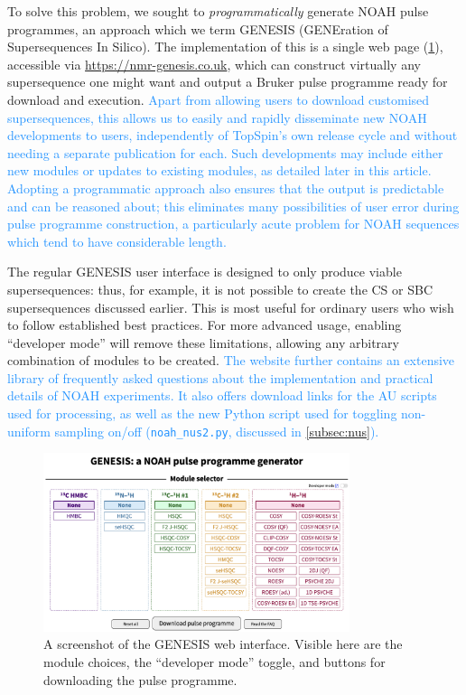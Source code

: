 \documentclass[a4paper,11pt]{article}
\newcommand{\changed}[1]{\textcolor{DodgerBlue}{#1}}
\newcommand{\theurl}{\url{https://nmr-genesis.co.uk}}
\begin{document}
\begin{refsection}
To solve this problem, we sought to \textit{programmatically} generate NOAH pulse programmes, an approach which we term GENESIS (GENEration of Supersequences In Silico).
The implementation of this is a single web page (\cref{fig:screenshot}), accessible via \theurl{}, which can construct virtually any supersequence one might want and output a Bruker pulse programme ready for download and execution.
\changed{
    Apart from allowing users to download customised supersequences, this allows us to easily and rapidly disseminate new NOAH developments to users, independently of TopSpin's own release cycle and without needing a separate publication for each.
    Such developments may include either new modules or updates to existing modules, as detailed later in this article.
    Adopting a programmatic approach also ensures that the output is predictable and can be reasoned about; this eliminates many possibilities of user error during pulse programme construction, a particularly acute problem for NOAH sequences which tend to have considerable length.
}

The regular GENESIS user interface is designed to only produce viable supersequences: thus, for example, it is not possible to create the CS or SBC supersequences discussed earlier.
This is most useful for ordinary users who wish to follow established best practices.
For more advanced usage, enabling ``developer mode'' will remove these limitations, allowing any arbitrary combination of modules to be created.
\changed{
    The website further contains an extensive library of frequently asked questions about the implementation and practical details of NOAH experiments.
    It also offers download links for the AU scripts used for processing, as well as the new Python script used for toggling non-uniform sampling on/off (\texttt{noah\_nus2.py}, discussed in \cref{subsec:nus}).
}

\begin{figure}
    \centering
    \includegraphics[width=0.8\textwidth]{screenshot.png}
    \caption{
        A screenshot of the GENESIS web interface.
        Visible here are the module choices, the ``developer mode'' toggle, and buttons for downloading the pulse programme.
    }
    \label{fig:screenshot}
\end{figure}


\end{refsection}
\end{document}
